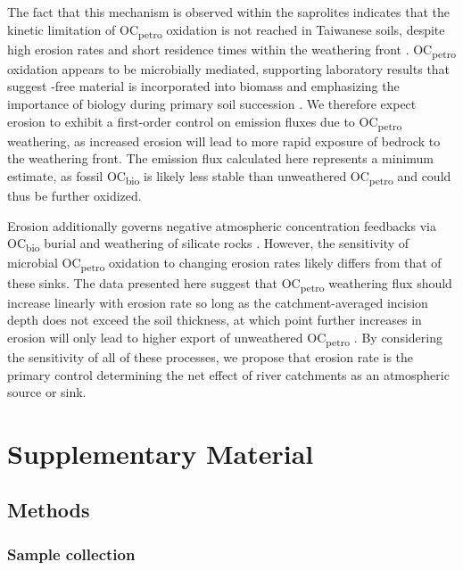 The fact that this mechanism is observed within the saprolites indicates that the kinetic limitation of OC\textsubscript{petro} oxidation is not reached in Taiwanese soils, despite high erosion rates and short residence times within the weathering front \citep{Dadson:2003kl}. OC\textsubscript{petro} oxidation appears to be microbially mediated, supporting laboratory results that suggest -free material is incorporated into biomass \citep{Petsch:2001eq,Petsch:2005gd} and emphasizing the importance of biology during primary soil succession \citep{Brantley:2011ku}. We therefore expect erosion to exhibit a first-order control on  emission fluxes due to OC\textsubscript{petro} weathering, as increased erosion will lead to more rapid exposure of bedrock to the weathering front. The  emission flux calculated here represents a minimum estimate, as fossil OC\textsubscript{bio} is likely less stable than unweathered OC\textsubscript{petro} and could thus be further oxidized.

Erosion additionally governs negative atmospheric  concentration feedbacks via OC\textsubscript{bio} burial \citep{FranceLanord:1997ua,Galy:2007ev} and weathering of silicate rocks \citep{West:2012cp,Maher:2014kq}. However, the sensitivity of microbial OC\textsubscript{petro} oxidation to changing erosion rates likely differs from that of these  sinks. The data presented here suggest that OC\textsubscript{petro} weathering flux should increase linearly with erosion rate so long as the catchment-averaged incision depth does not exceed the soil thickness, at which point further increases in erosion will only lead to higher export of unweathered OC\textsubscript{petro} \citep{Hilton:2011jw}. By considering the sensitivity of all of these processes, we propose that erosion rate is the primary control determining the net effect of river catchments as an atmospheric  source or sink.

\clearpage

\section{Supplementary Material}

\subsection{Methods}\label{Ch6M}

\subsubsection{Sample collection}

